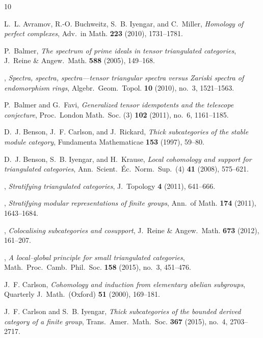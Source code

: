 \documentclass{amsart}[a4]
\theoremstyle{definition}
\theoremstyle{remark}
\numberwithin{equation}{section}
\begin{document}
\begin{thebibliography}{10}

L.~L. Avramov, R.-O. Buchweitz, S.~B. Iyengar, and C.~Miller, \emph{{Homology
  of perfect complexes}}, Adv.\ in Math. \textbf{223} (2010), 1731--1781.

P.~Balmer, \emph{{The spectrum of prime ideals in tensor triangulated
  categories}}, J.~Reine \& Angew.\ Math. \textbf{588} (2005), 149--168.

\bysame, \emph{{Spectra, spectra, spectra---tensor triangular spectra versus
  Zariski spectra of endomorphism rings}}, Algebr.\ Geom.\ Topol. \textbf{10}
  (2010), no.~3, 1521--1563.

P.~Balmer and G.~Favi, \emph{{Generalized tensor idempotents and the telescope
  conjecture}}, Proc.\ London Math.\ Soc. (3) \textbf{102} (2011), no.~6,
  1161--1185.

D.~J. Benson, J.~F. Carlson, and J.~Rickard, \emph{{Thick subcategories of the
  stable module category}}, Fundamenta Mathematicae \textbf{153} (1997),
  59--80.

D.~J. Benson, S.~B. Iyengar, and H.~Krause, \emph{{Local cohomology and support
  for triangulated categories}}, Ann.\ Scient.\ \'Ec.\ Norm.\ Sup.\ (4)
  \textbf{41} (2008), 575--621.

\bysame, \emph{{Stratifying triangulated categories}}, J.~Topology \textbf{4}
  (2011), 641--666.

\bysame, \emph{{\null Stratifying modular representations of finite groups}},
  Ann.\ of Math. \textbf{174} (2011), 1643--1684.

\bysame, \emph{{Colocalising subcategories and cosupport}}, J.~Reine \& Angew.\
  Math. \textbf{673} (2012), 161--207.

\bysame, \emph{{A local--global principle for small triangulated categories}},
  Math.\ Proc.\ Camb.\ Phil.\ Soc. \textbf{158} (2015), no.~3, 451--476.

J.~F. Carlson, \emph{{Cohomology and induction from elementary abelian
  subgroups}}, Quarterly J.\ Math.\ (Oxford) \textbf{51} (2000), 169--181.

J.~F. Carlson and S.~B. Iyengar, \emph{{Thick subcategories of the bounded
  derived category of a finite group}}, Trans.\ Amer.\ Math.\ Soc. \textbf{367}
  (2015), no.~4, 2703--2717.


\end{thebibliography}
\end{document}
